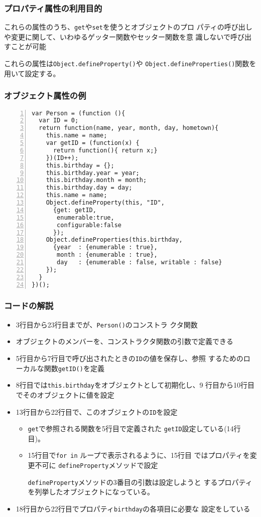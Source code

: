 \begin{frame}[containsverbatim]
 \frametitle{プロパティ属性の利用目的}
これらの属性のうち、\texttt{get}や\texttt{set}を使うとオブジェクトのプロ
 パティの呼び出しや変更に関して、いわゆるゲッター関数やセッター関数を意
 識しないで呼び出すことが可能

これらの属性は\texttt{Object.defineProperty()}や
\texttt{Object.defineProperties()}関数を用いて設定する。
\end{frame}
\begin{frame}[containsverbatim]
 \frametitle{オブジェクト属性の例}
 {\renewcommand{\theFancyVerbLine}{\tiny\arabic{FancyVerbLine}}
 \begin{Verbatim}[numbers=left,fontsize=\scriptsize,baselinestretch=0.9]
var Person = (function (){
  var ID = 0;
  return function(name, year, month, day, hometown){
    this.name = name;
    var getID = (function(x) {
      return function(){ return x;}
    })(ID++);
    this.birthday = {};
    this.birthday.year = year;
    this.birthday.month = month;
    this.birthday.day = day;
    this.name = name;
    Object.defineProperty(this, "ID",
      {get: getID,
       enumerable:true,
       configurable:false
      });
    Object.defineProperties(this.birthday,
      {year  : {enumerable : true},
       month : {enumerable : true},
       day   : {enumerable : false, writable : false}
    });
  }
})();
 \end{Verbatim}
 }
 \end{frame}
\begin{frame}[containsverbatim]
\frametitle{コードの解説}
	\begin{itemize}
	 \item 3行目から23行目までが、\texttt{Person()}のコンストラ
				 クタ関数
	 \item オブジェクトのメンバーを、コンストラクタ関数の引数で定義できる
	 \item 5行目から7行目で呼び出されたときの\texttt{ID}の値を保存し、参照
				 するためのローカルな関数\texttt{getID()}を定義
	 \item 8行目では\texttt{this.birthday}をオブジェクトとして初期化し、9
				 行目から10行目でそのオブジェクトに値を設定
	 \item 13行目から22行目で、このオブジェクトの\texttt{ID}を設定
				 \begin{itemize}\upshape
					\item \texttt{get}で参照される関数を5行目で定義された
								\texttt{getID}設定している(14行目)。
					\item 15行目で\texttt{for in} ループで表示されるように、15行目
								ではプロパティを変更不可に
								\texttt{defineProperty}メソッドで設定

								\texttt{defineProperty}メソッドの3番目の引数は設定しようと
								するプロパティを列挙したオブジェクトになっている。
				 \end{itemize}
	 \item 18行目から22行目でプロパティ\texttt{birthday}の各項目に必要な
				 設定をしている
	\end{itemize}
\end{frame}
